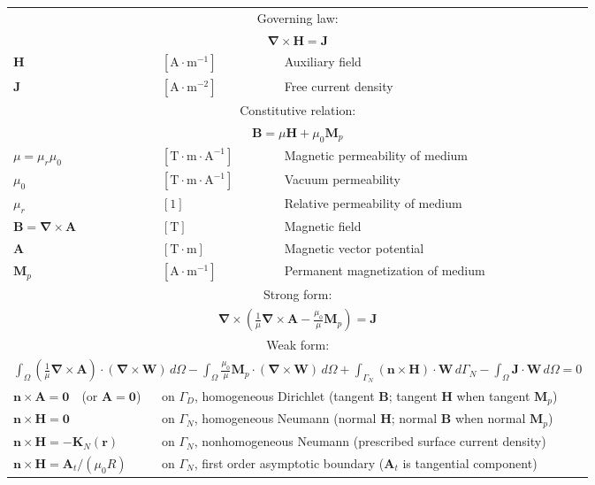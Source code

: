 \documentclass[letterpaper]{article}
\newcommand{\vect}[1]{\mathbf#1}
\newcommand{\nab}{\vect{\nabla}}
\begin{document}
\begin{table}[h!]
\centering
\begin{tabular}{lll}
\hline
\multicolumn{3}{c}{Governing law:} \\
\multicolumn{3}{c}{$\nab\times\vect{H}=\vect{J}$}\\
$\vect{H}$ & $[\text{A}\cdot \text{m}^{-1}]$ & Auxiliary field\\
$\vect{J}$ & $[\text{A}\cdot\text{m}^{-2}]$ & Free current density\\
\hline

\multicolumn{3}{c}{Constitutive relation:} \\
\multicolumn{3}{c}{ $\vect{B}=\mu\vect{H}+\mu_0\vect{M}_{p}$}\\
$\mu=\mu_r\mu_0$ & $[\text{T} \cdot \text{m} \cdot \text{A}^{-1}]$ & Magnetic permeability of medium\\ %
$\mu_0$ &  $[\text{T} \cdot \text{m} \cdot \text{A}^{-1}]$ & Vacuum permeability\\
$\mu_r$ & $[1]$ & Relative permeability of medium\\
$\vect{B}=\nab \times\vect{A}$ & $[\text{T}]$ & Magnetic field\\
$\vect{A}$ & $[\text{T}\cdot \text{m}]$ & Magnetic vector potential\\
$\vect{M}_p$ & $[\text{A}\cdot \text{m}^{-1}]$ & Permanent magnetization of medium\\
\hline

\multicolumn{3}{c}{Strong form:} \\[1pt]
\multicolumn{3}{c}{$\displaystyle\nab\times\left(\frac{1}{\mu}\nab\times \vect{A}-\frac{\mu_0}{\mu}\vect{M}_{p}\right)=\vect{J}$}\\[7pt]
\hline

\multicolumn{3}{c}{Weak form:} \\[1pt]
\multicolumn{3}{c}{$\displaystyle\int_\Omega\left(\frac{1}{\mu}\nab\times\vect{A}\right)\cdot(\nab\times\vect{W})\,d\Omega
-\int_\Omega\frac{\mu_0}{\mu}\vect{M}_p\cdot(\nab\times\vect{W})\,d\Omega
+\int_{\Gamma_N}(\vect{n}\times\vect{H})\cdot\vect{W}\,d{\Gamma_N}
-\int_\Omega\vect{J}\cdot\vect{W}\,d\Omega=0$}\\[9pt]
$\vect{n}\times\vect{A}=\vect{0}$~~(or $\vect{A}=\vect{0}$) & \multicolumn{2}{l}{on $\Gamma_D$, homogeneous Dirichlet (tangent $\vect{B}$; tangent $\vect{H}$ when tangent $\vect{M}_{p}$)}\\
$\vect{n}\times\vect{H}=\vect{0}$ & \multicolumn{2}{l}{on $\Gamma_N$, homogeneous Neumann (normal $\vect{H}$; normal $\vect{B}$ when normal $\vect{M}_{p}$)}\\
$\vect{n}\times\vect{H}=-\vect{K}_N(\vect{r})$ & \multicolumn{2}{l}{on $\Gamma_N$, nonhomogeneous Neumann (prescribed surface current density)}\\
$\vect{n}\times\vect{H}=\vect{A}_t/(\mu_0 R)$ & \multicolumn{2}{l}{on $\Gamma_N$, first order asymptotic boundary ($\vect{A}_t$ is tangential component)}\\


\end{tabular}
\end{table}
\end{document}
